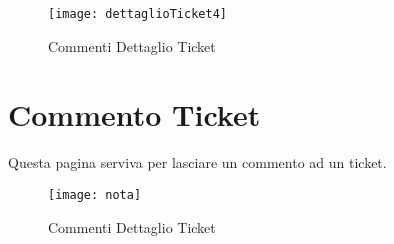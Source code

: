 \begin{figure}[H]
	\centering
    \texttt{[image: dettaglioTicket4]} 
\caption{Commenti Dettaglio Ticket}
\end{figure}
\newpage
\section{Commento Ticket}
Questa pagina serviva per lasciare un commento ad un ticket.


\begin{figure}[H]
	\centering
    \texttt{[image: nota]} 
\caption{Commenti Dettaglio Ticket}
\end{figure}
